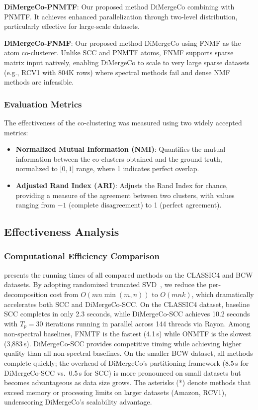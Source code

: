 \documentclass[journal]{IEEEtran}
\theoremstyle{definition}
\theoremstyle{remark} %
\renewcommand{\cite}[1]{~\autocite{#1}}
\begin{document}
\begin{itemize}
    \item \textbf{DiMergeCo-PNMTF}:
          Our proposed method DiMergeCo combining with PNMTF. It achieves enhanced parallelization through two-level distribution, particularly effective for large-scale datasets.

    {\color{blue}
    \item \textbf{DiMergeCo-FNMF}:
          Our proposed method DiMergeCo using FNMF as the atom co-clusterer. Unlike SCC and PNMTF atoms, FNMF supports sparse matrix input natively, enabling DiMergeCo to scale to very large sparse datasets (e.g., RCV1 with 804K rows) where spectral methods fail and dense NMF methods are infeasible.
    }
\end{itemize}

\subsubsection{Evaluation Metrics}
The effectiveness of the co-clustering was measured using two widely accepted metrics:
\begin{itemize}
    \item \textbf{Normalized Mutual Information (NMI)}: Quantifies the mutual information between the co-clusters obtained and the ground truth, normalized to \(\lbrack 0,1 \rbrack \) range, where 1 indicates perfect overlap.
    \item \textbf{Adjusted Rand Index (ARI)}: Adjusts the Rand Index for chance, providing a measure of the agreement between two clusters, with values ranging from $-1$ (complete disagreement) to 1 (perfect agreement).
\end{itemize}


\subsection{Effectiveness Analysis}
\subsubsection{Computational Efficiency Comparison}
{\color{blue}
 presents the running times of all compared methods on the CLASSIC4 and BCW datasets. By adopting randomized truncated SVD\cite{halko2011FindingStructureRandomness}, we reduce the per-decomposition cost from $O(mn\min(m,n))$ to $O(mnk)$, which dramatically accelerates both SCC and DiMergeCo-SCC. On the CLASSIC4 dataset, baseline SCC completes in only 2.3 seconds, while DiMergeCo-SCC achieves 10.2 seconds with $T_p=30$ iterations running in parallel across 144 threads via Rayon. Among non-spectral baselines, FNMTF is the fastest (4.1\,s) while ONMTF is the slowest (3{,}883\,s). DiMergeCo-SCC provides competitive timing while achieving higher quality than all non-spectral baselines. On the smaller BCW dataset, all methods complete quickly; the overhead of DiMergeCo's partitioning framework (8.5\,s for DiMergeCo-SCC vs.\ 0.5\,s for SCC) is more pronounced on small datasets but becomes advantageous as data size grows. The asterisks (*) denote methods that exceed memory or processing limits on larger datasets (Amazon, RCV1), underscoring DiMergeCo's scalability advantage.
}
\end{document}
